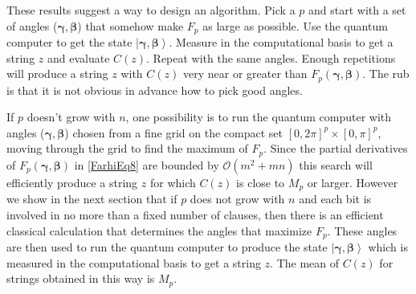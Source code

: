\documentclass[t11pt,reprint,preprint,preprintnumbers]{revtex4}
\newcommand{\ket}[1]{\left|#1\right\rangle}
\begin{document}
These results suggest a way to design an algorithm.  Pick a $p$ and start with a set of angles ($\boldsymbol{\gamma}, \boldsymbol{\beta}$) that somehow make $F_p$ as large as possible. Use the quantum computer to get the state $\ket{\boldsymbol{\gamma}, \boldsymbol{\beta}}$.  Measure in the computational basis to get a string $z$ and evaluate $C(z)$. Repeat with the same angles. Enough repetitions will produce a string $z$ with $C(z)$ very near or greater than $F_p (\boldsymbol{\gamma}, \boldsymbol{\beta})$. The rub is that it is not obvious in advance how to pick good angles.  

If $p$ doesn't grow with $n$, one possibility is to run the quantum computer with  angles ($\boldsymbol{\gamma}, \boldsymbol{\beta}$) chosen from a fine grid on the compact set $[0,2\pi]^{p}\times[0,\pi]^p$, moving through the grid to find the maximum of $F_p$. Since the partial derivatives of $F_p (\boldsymbol{\gamma}, \boldsymbol{\beta})$ in \eqref{FarhiEq8} are bounded by $\mathcal{O} (m^2 + m n)$ this search will efficiently produce a string $z$ for which $C(z)$ is close to $M_p$ or larger. However we show in the next section that if $p$ does not grow with $n$ and each bit is involved in no more than a fixed number of clauses, then there is an efficient classical calculation that determines the angles that maximize $F_p$. These angles are then used to run the quantum computer to produce the state $\ket{\boldsymbol{\gamma}, \boldsymbol{\beta}}$ which is measured in the computational basis to get a string $z$. The mean of $C(z)$ for strings obtained in this way is $M_p$.
\end{document}
